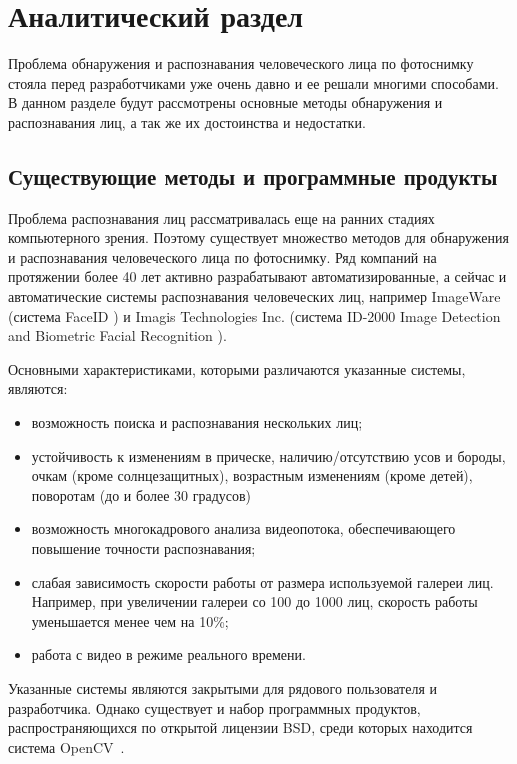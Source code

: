 \section{Аналитический раздел}

Проблема обнаружения и распознавания человеческого лица по фотоснимку стояла
перед разработчиками уже очень давно и ее решали многими способами.
В данном разделе будут рассмотрены основные методы обнаружения и распознавания
лиц, а так же их достоинства и недостатки.

\subsection{Существующие методы и программные продукты}

Проблема распознавания лиц рассматривалась еще на ранних
стадиях компьютерного зрения. Поэтому
существует множество методов для обнаружения и распознавания человеческого
лица по фотоснимку.
Ряд компаний на протяжении более 40 лет активно разрабатывают
автоматизированные, а сейчас и автоматические системы распознавания
человеческих лиц, например 
ImageWare (система FaceID \cite{faceid}) и Imagis Technologies Inc. (система
ID-2000 Image Detection and Biometric Facial Recognition \cite{imagis}).

Основными характеристиками, которыми различаются указанные системы, являются:
\begin{itemize}
    \item возможность поиска и распознавания нескольких лиц;
    \item устойчивость к изменениям в прическе, наличию/отсутствию усов
        и бороды, очкам (кроме солнцезащитных), возрастным
        изменениям (кроме детей), поворотам (до и более 30 градусов)
    \item возможность многокадрового анализа видеопотока,
        обеспечивающего повышение точности распознавания;
    \item слабая зависимость скорости работы от размера используемой
        галереи лиц. Например, при увеличении галереи со 100 до
        1000 лиц, скорость работы уменьшается менее чем на 10\%;
    \item работа с видео в режиме реального времени.
\end{itemize}

Указанные системы являются закрытыми для рядового пользователя и разработчика.
Однако существует и набор программных продуктов, распространяющихся по
открытой лицензии BSD, среди которых находится система OpenCV~\cite{opencv}.


